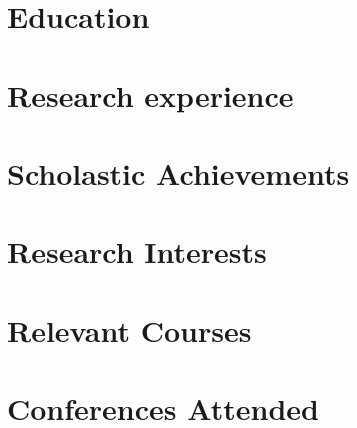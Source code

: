 \documentclass{prometheus_cv}
\begin{document}
\thispagestyle{empty}					%
\pagestyle{fancy}			 		%

\vspace*{-1cm}
\centering 


\vspace*{0.4cm}
\section{Education}


\section{Research experience}


\section{Scholastic Achievements}

\section{Research Interests}


\section{Relevant Courses}


\section{Conferences Attended}

\end{document}
